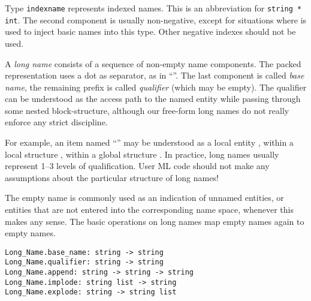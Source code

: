 \begin{isabellebody}
\begin{isamarkuptext}
  \begin{description}

  \item Type \verb|indexname| represents indexed names.  This is
  an abbreviation for \verb|string * int|.  The second component
  is usually non-negative, except for situations where  is used to inject basic names into this type.  Other negative
  indexes should not be used.

  \end{description}%
\end{isamarkuptext}%
\isamarkuptrue%
%
\endisatagmlref
{\isafoldmlref}%
%
\isadelimmlref
%
\endisadelimmlref
%
\isamarkuptrue%
%
\begin{isamarkuptext}%
A \emph{long name} consists of a sequence of non-empty name
  components.  The packed representation uses a dot as separator, as
  in ``''.  The last component is called \emph{base
  name}, the remaining prefix is called \emph{qualifier} (which may be
  empty).  The qualifier can be understood as the access path to the
  named entity while passing through some nested block-structure,
  although our free-form long names do not really enforce any strict
  discipline.

  For example, an item named ``'' may be understood as
  a local entity , within a local structure ,
  within a global structure .  In practice, long names
  usually represent 1--3 levels of qualification.  User ML code should
  not make any assumptions about the particular structure of long
  names!

  The empty name is commonly used as an indication of unnamed
  entities, or entities that are not entered into the corresponding
  name space, whenever this makes any sense.  The basic operations on
  long names map empty names again to empty names.%
\end{isamarkuptext}%
\isamarkuptrue%
%
\isadelimmlref
%
\endisadelimmlref
%
\isatagmlref
%
\begin{isamarkuptext}%
\begin{mldecls}
  \verb|Long_Name.base_name: string -> string| \\
  \verb|Long_Name.qualifier: string -> string| \\
  \verb|Long_Name.append: string -> string -> string| \\
  \verb|Long_Name.implode: string list -> string| \\
  \verb|Long_Name.explode: string -> string list| \\
  \end{mldecls}


\end{isamarkuptext}
\end{isabellebody}
